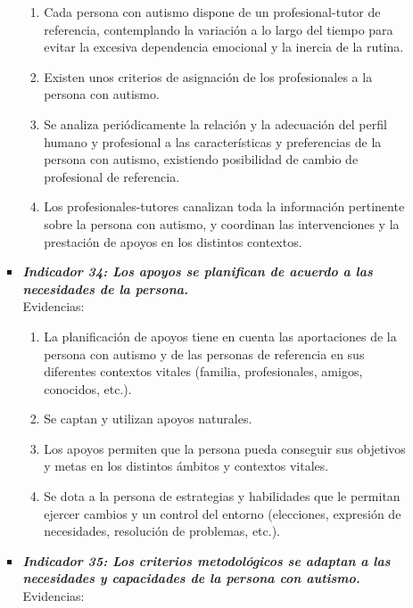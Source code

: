 \begin{itemize}
\begin{itemize}
\begin{itemize}
			\begin{enumerate}
				\item Cada persona con autismo dispone de un profesional-tutor de referencia, contemplando la variación a lo largo del tiempo para evitar la excesiva dependencia emocional y la inercia de la rutina. 
				\item Existen unos criterios de asignación de los profesionales a la persona con autismo. 
				\item Se analiza periódicamente la relación y la adecuación del perfil humano y profesional a las características y preferencias de la persona con autismo, existiendo posibilidad de cambio de profesional de referencia. 
				\item Los profesionales-tutores canalizan toda la información pertinente sobre la persona con autismo, y coordinan las intervenciones y la prestación de apoyos en los distintos contextos. 
				 
			\end{enumerate}

			\item \textbf{\textit{Indicador 34: Los apoyos se planifican de acuerdo a las necesidades de la persona.}}\\Evidencias:
			
			\begin{enumerate}
				\item La planificación de apoyos tiene en cuenta las aportaciones de la persona con autismo y de las personas de referencia en sus diferentes contextos vitales (familia, profesionales, amigos, conocidos, etc.). 
				\item Se captan y utilizan apoyos naturales.  
				\item Los apoyos permiten que la persona pueda conseguir sus objetivos y metas en los distintos ámbitos y contextos vitales. 
				\item Se dota a la persona de estrategias y habilidades que le permitan ejercer cambios y un control del entorno (elecciones, expresión de necesidades, resolución de problemas, etc.). 
				 
			\end{enumerate}

			\item \textbf{\textit{Indicador 35: Los criterios metodológicos se adaptan a las necesidades y capacidades de la persona con autismo.}}\\Evidencias:
			

\end{itemize}
\end{itemize}
\end{itemize}
